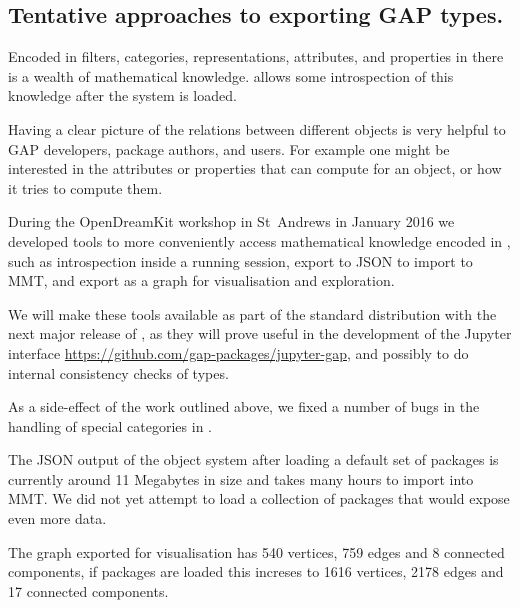 
\subsection{Tentative approaches to exporting GAP types.}\label{gap-types-export}

Encoded in filters, categories, representations, attributes, and properties in \GAP
there is a wealth of mathematical knowledge. \GAP allows some introspection
of this knowledge after the system is loaded.

Having a clear picture of the relations between different objects is 
very helpful to GAP developers, package authors, and users.
For example one might be interested in the attributes or properties that \GAP can
compute for an object, or how it tries to compute them.

During the OpenDreamKit workshop in St~Andrews in January 2016 we developed
tools to more conveniently access mathematical knowledge encoded in \GAP,
such as introspection inside a running \GAP session, export to JSON to import
to MMT, and export as a graph for visualisation and exploration.

We will make these tools available as part of the standard \GAP distribution with the next
major release of \GAP, as they will prove useful in the development of the \GAP Jupyter interface
\url{https://github.com/gap-packages/jupyter-gap}, and possibly to do
internal consistency checks of \GAP types.

As a side-effect of the work outlined above, we fixed a number of bugs in the handling of
special categories in \GAP.

The JSON output of the \GAP object system after loading a default set of packages is currently
around 11 Megabytes in size and takes many hours to import into MMT. We did not yet attempt to
load a collection of \GAP packages that would expose even more data.

The graph exported for visualisation has 540 vertices, 759 edges and 8 connected components, if
packages are loaded this increses to 1616 vertices, 2178 edges and 17 connected components.


